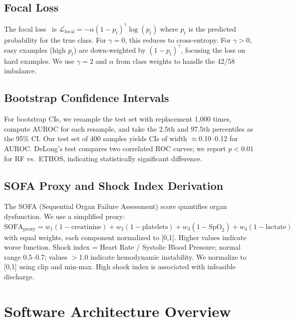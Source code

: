 \subsection{Focal Loss}

The focal loss~\cite{lin2017focal} is $\mathcal{L}_{\text{focal}} = -\alpha (1-p_t)^\gamma \log(p_t)$ where $p_t$ is the predicted probability for the true class. For $\gamma = 0$, this reduces to cross-entropy. For $\gamma > 0$, easy examples (high $p_t$) are down-weighted by $(1-p_t)^\gamma$, focusing the loss on hard examples. We use $\gamma = 2$ and $\alpha$ from class weights to handle the 42/58 imbalance.

\subsection{Bootstrap Confidence Intervals}

For bootstrap CIs, we resample the test set with replacement 1,000 times, compute AUROC for each resample, and take the 2.5th and 97.5th percentiles as the 95\% CI. Our test set of 400 samples yields CIs of width $\approx$0.10--0.12 for AUROC. DeLong's test compares two correlated ROC curves; we report $p < 0.01$ for RF vs.\ ETHOS, indicating statistically significant difference.

\subsection{SOFA Proxy and Shock Index Derivation}

The SOFA (Sequential Organ Failure Assessment) score quantifies organ dysfunction. We use a simplified proxy: $\text{SOFA}_{\text{proxy}} = w_1(1 - \text{creatinine}) + w_2(1 - \text{platelets}) + w_3(1 - \text{SpO}_2) + w_4(1 - \text{lactate})$ with equal weights, each component normalized to [0,1]. Higher values indicate worse function. Shock index = Heart Rate / Systolic Blood Pressure; normal range 0.5--0.7; values $>$1.0 indicate hemodynamic instability. We normalize to [0,1] using clip and min-max. High shock index is associated with infeasible discharge.

\section{Software Architecture Overview}

